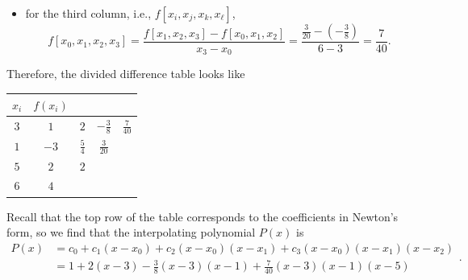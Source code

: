 \documentclass[letterpaper]{article}
\begin{document}
\begin{mdframed}
\begin{mdframed}
\begin{itemize}
            \item for the third column, i.e., $f[x_i, x_j, x_k, x_\ell]$, 
            \[f[x_0, x_1, x_2, x_3] = \frac{f[x_1, x_2, x_3] - f[x_0, x_1, x_2]}{x_3 - x_0} = \frac{\frac{3}{20} - \left(-\frac{3}{8}\right)}{6 - 3} = \frac{7}{40}.\]
        \end{itemize}
        Therefore, the divided difference table looks like 
        \begin{center}
            \begin{tabular}{c||c c c c}
                $x_i$ & $f(x_i)$ &   &    &    \\ 
                \hline 
                $3$ & $1$ & $2$ & $-\frac{3}{8}$ & $\frac{7}{40}$ \\ 
                $1$ & $-3$ & $\frac{5}{4}$ & $\frac{3}{20}$ & \\ 
                $5$ & $2$ & $2$ &                    & \\ 
                $6$ & $4$ &    
            \end{tabular}
        \end{center}
        Recall that the top row of the table corresponds to the coefficients in Newton's form, so we find that the interpolating polynomial $P(x)$ is 
        \[\begin{aligned}
            P(x) &= c_0 + c_1 (x - x_0) + c_2 (x - x_0) (x - x_1) + c_3 (x - x_0) (x - x_1) (x - x_2) \\ 
                &= 1 + 2(x - 3) - \frac{3}{8}(x - 3)(x - 1) + \frac{7}{40}(x - 3)(x - 1)(x - 5)
        \end{aligned}.\]
    \end{mdframed}
\end{mdframed}
\end{document}
